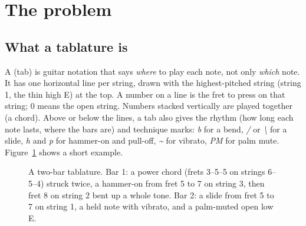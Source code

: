 \section{The problem}
\label{sec:problem}

\subsection{What a tablature is}

A  (tab) is guitar notation that says \emph{where} to play each
note, not only \emph{which} note. It has one horizontal line per string, drawn
with the highest-pitched string (string 1, the thin high E) at the top. A number
on a line is the fret to press on that string; 0 means the open string. Numbers
stacked vertically are played together (a chord). Above or below the lines, a
tab also gives the rhythm (how long each note lasts, where the bars are) and
technique marks: \emph{b} for a bend, \emph{/} or \emph{\textbackslash} for a
slide, \emph{h} and \emph{p} for hammer-on and pull-off, \emph{\textasciitilde}
for vibrato, \emph{PM} for palm mute. Figure~\ref{fig:tab} shows a short example.

\begin{figure}[h]
\centering
{}
\caption{A two-bar tablature. Bar 1: a power chord (frets 3--5--5 on strings
6--5--4) struck twice, a hammer-on from fret 5 to 7 on string 3, then fret 8 on
string 2 bent up a whole tone. Bar 2: a slide from fret 5 to 7 on string 1, a
held note with vibrato, and a palm-muted open low E.}
\label{fig:tab}
\end{figure}

